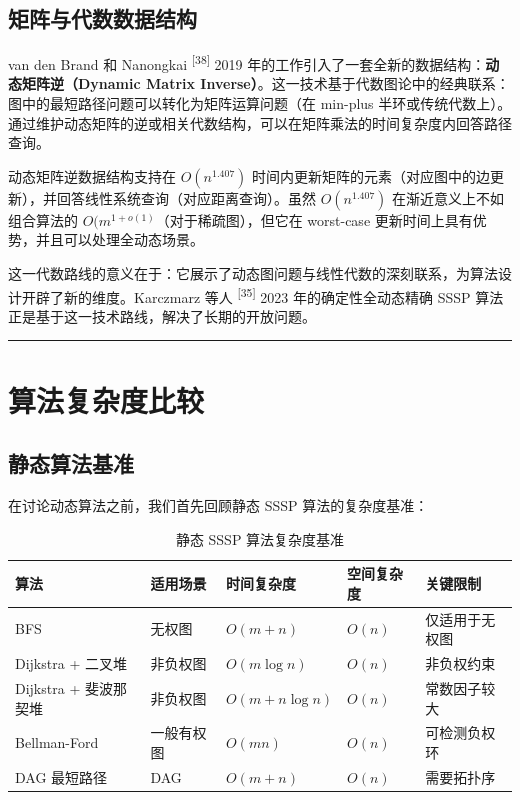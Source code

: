 \documentclass[12pt,a4paper]{ctexart}
\let\oldsection\section
\renewcommand{\section}{\clearpage\oldsection}
\begin{document}
\subsection{矩阵与代数数据结构}

van den Brand 和 Nanongkai \textsuperscript{[38]}  2019 年的工作引入了一套全新的数据结构：\textbf{动态矩阵逆（Dynamic Matrix Inverse）}。这一技术基于代数图论中的经典联系：图中的最短路径问题可以转化为矩阵运算问题（在 min-plus 半环或传统代数上）。通过维护动态矩阵的逆或相关代数结构，可以在矩阵乘法的时间复杂度内回答路径查询。

动态矩阵逆数据结构支持在 $O(n^{1.407})$ 时间内更新矩阵的元素（对应图中的边更新），并回答线性系统查询（对应距离查询）。虽然 $O(n^{1.407})$ 在渐近意义上不如组合算法的 $O(m^{1+o(1)}$（对于稀疏图），但它在 worst-case 更新时间上具有优势，并且可以处理全动态场景。

这一代数路线的意义在于：它展示了动态图问题与线性代数的深刻联系，为算法设计开辟了新的维度。Karczmarz 等人 \textsuperscript{[35]}  2023 年的确定性全动态精确 SSSP 算法正是基于这一技术路线，解决了长期的开放问题。

\noindent\rule{\textwidth}{0.4pt}
\section{算法复杂度比较}

\subsection{静态算法基准}

在讨论动态算法之前，我们首先回顾静态 SSSP 算法的复杂度基准：

\begin{table}[H]
\centering
\caption{静态 SSSP 算法复杂度基准}
\label{tab:static}
\begin{tabular}{|p{2.5cm}|p{2.5cm}|p{3.5cm}|p{1.5cm}|p{2.5cm}|}
\toprule
\textbf{算法} & \textbf{适用场景} & \textbf{时间复杂度} & \textbf{空间复杂度} & \textbf{关键限制} \\
\midrule
BFS & 无权图 & $O(m+n)$ & $O(n)$ & 仅适用于无权图 \\
Dijkstra + 二叉堆 & 非负权图 & $O(m\log n)$ & $O(n)$ & 非负权约束 \\
Dijkstra + 斐波那契堆 & 非负权图 & $O(m+n\log n)$ & $O(n)$ & 常数因子较大 \\
Bellman-Ford & 一般有权图 & $O(mn)$ & $O(n)$ & 可检测负权环 \\
DAG 最短路径 & DAG & $O(m+n)$ & $O(n)$ & 需要拓扑序 \\
\bottomrule
\end{tabular}
\end{table}
\end{document}
